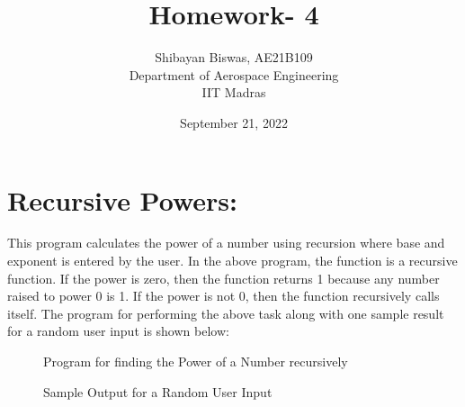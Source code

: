 \documentclass[12pt,a4paper]{article}
\author{ Shibayan Biswas, AE21B109\\ Department of Aerospace Engineering\\ IIT Madras}
\title{Homework- 4}
\date{September 21, 2022}
\begin{document}
\maketitle
\hline
\section{Recursive Powers:}
This program calculates the power of a number using recursion where base and exponent is entered by the user. In the above program, the function is a recursive function. If the power is zero, then the function returns 1 because any number raised to power 0 is 1. If the power is not 0, then the function recursively calls itself. The program for performing the above task along with one sample result for a random user input is shown below:
\begin{figure}[!ht]
	\begin{center}
	\end{center}
	\caption{Program for finding the Power of a Number recursively}
\end{figure}
\clearpage
\begin{figure}[!ht]
	\begin{center}
	\end{center}
	\caption{Sample Output for a Random User Input}
\end{figure}
\end{document}
